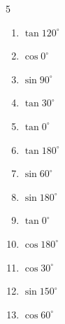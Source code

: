\begin{multicols}{5}
\begin{enumerate}

  \item $\displaystyle \tan{120^\circ}$


  \item $\displaystyle \cos{0^\circ}$

        \phantom{$\displaystyle =1$}

  \item $\displaystyle \sin{90^\circ}$

        \phantom{$\displaystyle =1$}

\columnbreak %

  \item $\displaystyle \tan{30^\circ}$


  \item $\displaystyle \tan{0^\circ}$

        \phantom{$\displaystyle =0$}

  \item $\displaystyle \tan{180^\circ}$

        \phantom{$\displaystyle =0$}

  \item $\displaystyle \sin{60^\circ}$


  \item $\displaystyle \sin{180^\circ}$

        \phantom{$\displaystyle =0$}

  \item $\displaystyle \tan{0^\circ}$

        \phantom{$\displaystyle =0$}

  \item $\displaystyle \cos{180^\circ}$

        \phantom{$\displaystyle =-1$}

  \item $\displaystyle \cos{30^\circ}$


  \item $\displaystyle \sin{150^\circ}$


  \item $\displaystyle \cos{60^\circ}$


\end{enumerate}
\end{multicols}
